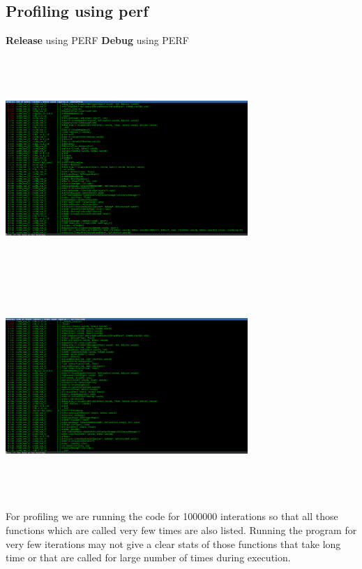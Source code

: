 \documentclass{article}
\begin{document}
\subsection{Profiling using perf}
\textbf{Release} using PERF      				\hfill	\textbf{Debug} using PERF\\\\
\includegraphics[width=260pt,height=230pt]{perf_release}\hfill
\includegraphics[width=260pt,height=230pt]{perf_debug}\\\\
For profiling we are running the code for 1000000 interations so that all those functions which are called very few times are also listed.
Running the program for very few iterations may not give a clear stats of those functions that take long time or that are called for large 
number of times during execution.
\end{document}
